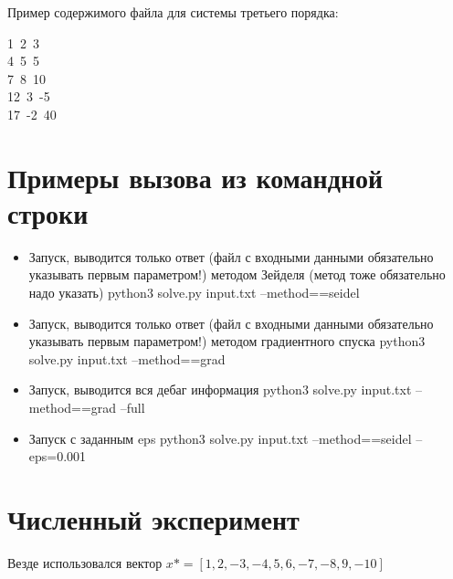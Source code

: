 \documentclass[paper=a4, fontsize=11pt]{scrartcl} %
\numberwithin{equation}{section} %
\numberwithin{figure}{section} %
\numberwithin{table}{section} %
\begin{document}
Пример содержимого файла для системы третьего порядка:

\begin{flushleft} 
1\ 2\ 3\\
4\ 5\ 5\\
7\ 8\ 10\\
12\ 3\ -5\\
17\ -2\ 40\\
\end{flushleft}


\section{Примеры вызова из командной строки}

\begin{itemize}
	\item Запуск, выводится только ответ (файл с входными данными обязательно указывать первым параметром!) методом Зейделя (метод тоже обязательно надо указать)
	\subitem python3 solve.py input.txt --method==seidel
    
    \item Запуск, выводится только ответ (файл с входными данными обязательно указывать первым параметром!) методом градиентного спуска
	\subitem python3 solve.py input.txt --method==grad

	\item Запуск, выводится вся дебаг информация
	\subitem python3 solve.py input.txt --method==grad –full

	\item Запуск с заданным eps
	\subitem python3 solve.py input.txt --method==seidel --eps=0.001

\end{itemize}


\section{Численный эксперимент}

Везде использовался вектор $x*=[1, 2, -3, -4, 5, 6, -7, -8, 9, -10]$
\end{document}

